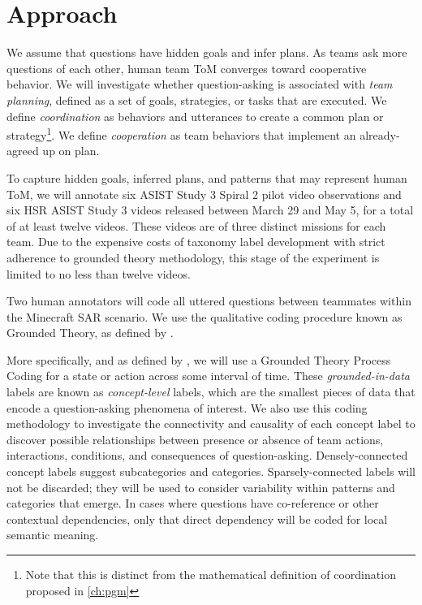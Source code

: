 \documentclass[10pt]{article}
\begin{document}
\section{Approach}

We assume that questions have hidden goals and infer plans. As teams ask more
questions of each other, human team ToM converges toward cooperative behavior.
We will investigate whether question-asking is associated with \emph{team
planning}, defined as a set of goals, strategies, or tasks that are executed.
We define \emph{coordination} as behaviors and utterances to create a common
plan or strategy\footnote{Note that this is distinct from the mathematical
definition of coordination proposed in \autoref{ch:pgm}}. We define
\emph{cooperation} as team behaviors that implement an already-agreed up on
plan.

To capture hidden goals, inferred plans, and patterns that may represent human
ToM, we will annotate six ASIST Study 3 Spiral 2 pilot video observations and
six HSR ASIST Study 3 videos released between March 29 and May 5, for a total
of at least twelve videos. These videos are of three distinct missions for each
team. Due to the expensive costs of taxonomy label development with strict
adherence to grounded theory methodology, this stage of the experiment is
limited to no less than twelve videos. 

Two human annotators will code all uttered questions between teammates within the Minecraft SAR scenario.
We use the qualitative coding procedure known as Grounded Theory,
as defined by \citet{corbin_strauss_2015}. 

More specifically, and as defined by \citet{saldana_2021}, we will use a
Grounded Theory Process Coding for a state or action across some interval of
time. These \emph{grounded-in-data} labels are known as \emph{concept-level}
labels, which are the smallest pieces of data that encode a question-asking
phenomena of interest. We also use this coding methodology to investigate the connectivity and
causality of each concept label to discover possible relationships between
presence or absence of team actions, interactions, conditions, and consequences
of question-asking. Densely-connected concept labels suggest subcategories and
categories. Sparsely-connected labels will not be discarded; they will be used
to consider variability within patterns and categories that emerge. In cases
where questions have co-reference or other contextual dependencies, only that
direct dependency will be coded for local semantic meaning.
\end{document}
